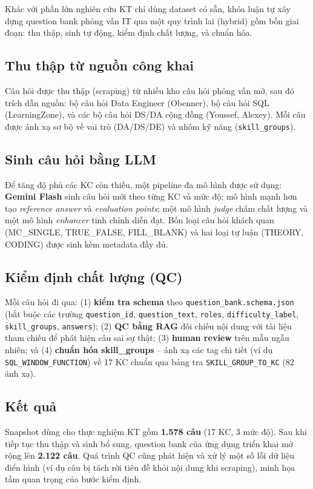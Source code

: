 Khác với phần lớn nghiên cứu KT chỉ dùng dataset có sẵn, khóa luận tự xây dựng question bank phỏng vấn IT qua một quy trình lai (hybrid) gồm bốn giai đoạn: thu thập, sinh tự động, kiểm định chất lượng, và chuẩn hóa.

\subsection{Thu thập từ nguồn công khai}
Câu hỏi được thu thập (scraping) từ nhiều kho câu hỏi phỏng vấn mở, sau đó trích dẫn nguồn: bộ câu hỏi Data Engineer (Obenner), bộ câu hỏi SQL (LearningZone), và các bộ câu hỏi DS/DA cộng đồng (Youssef, Alexey). Mỗi câu được ánh xạ sơ bộ về vai trò (DA/DS/DE) và nhóm kỹ năng (\texttt{skill\_groups}).

\subsection{Sinh câu hỏi bằng LLM}
Để tăng độ phủ các KC còn thiếu, một pipeline đa mô hình được sử dụng: \textbf{Gemini Flash} sinh câu hỏi mới theo từng KC và mức độ; mô hình mạnh hơn tạo \textit{reference answer} và \textit{evaluation points}; một mô hình \textit{judge} chấm chất lượng và một mô hình \textit{enhancer} tinh chỉnh diễn đạt. Bốn loại câu hỏi khách quan (MC\_SINGLE, TRUE\_FALSE, FILL\_BLANK) và hai loại tự luận (THEORY, CODING) được sinh kèm metadata đầy đủ.

\subsection{Kiểm định chất lượng (QC)}
Mỗi câu hỏi đi qua: (1) \textbf{kiểm tra schema} theo \texttt{question\_bank.schema.json} (bắt buộc các trường \texttt{question\_id}, \texttt{question\_text}, \texttt{roles}, \texttt{difficulty\_label}, \texttt{skill\_groups}, \texttt{answers}); (2) \textbf{QC bằng RAG} đối chiếu nội dung với tài liệu tham chiếu để phát hiện câu sai sự thật; (3) \textbf{human review} trên mẫu ngẫu nhiên; và (4) \textbf{chuẩn hóa skill\_groups} -- ánh xạ các tag chi tiết (ví dụ \texttt{SQL\_WINDOW\_FUNCTION}) về 17 KC chuẩn qua bảng tra \texttt{SKILL\_GROUP\_TO\_KC} (82 ánh xạ).

\subsection{Kết quả}
Snapshot dùng cho thực nghiệm KT gồm \textbf{1.578 câu} (17 KC, 3 mức độ). Sau khi tiếp tục thu thập và sinh bổ sung, question bank của ứng dụng triển khai mở rộng lên \textbf{2.122 câu}. Quá trình QC cũng phát hiện và xử lý một số lỗi dữ liệu điển hình (ví dụ câu bị tách rời tiêu đề khỏi nội dung khi scraping), minh họa tầm quan trọng của bước kiểm định.

